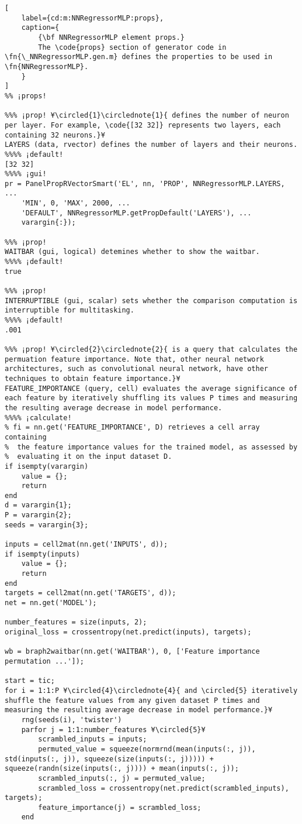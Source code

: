 \documentclass{tufte-handout}
\begin{document}
\begin{lstlisting}[
	label={cd:m:NNRegressorMLP:props},
	caption={
		{\bf NNRegressorMLP element props.}
		The \code{props} section of generator code in \fn{\_NNRegressorMLP.gen.m} defines the properties to be used in \fn{NNRegressorMLP}.
	}
]
%% ¡props!

%%% ¡prop! ¥\circled{1}\circlednote{1}{ defines the number of neuron per layer. For example, \code{[32 32]} represents two layers, each containing 32 neurons.}¥
LAYERS (data, rvector) defines the number of layers and their neurons.
%%%% ¡default!
[32 32]
%%%% ¡gui!
pr = PanelPropRVectorSmart('EL', nn, 'PROP', NNRegressorMLP.LAYERS, ...
    'MIN', 0, 'MAX', 2000, ...
    'DEFAULT', NNRegressorMLP.getPropDefault('LAYERS'), ...
    varargin{:});

%%% ¡prop!
WAITBAR (gui, logical) detemines whether to show the waitbar.
%%%% ¡default!
true

%%% ¡prop!
INTERRUPTIBLE (gui, scalar) sets whether the comparison computation is interruptible for multitasking.
%%%% ¡default!
.001

%%% ¡prop! ¥\circled{2}\circlednote{2}{ is a query that calculates the permuation feature importance. Note that, other neural network architectures, such as convolutional neural network, have other techniques to obtain feature importance.}¥
FEATURE_IMPORTANCE (query, cell) evaluates the average significance of each feature by iteratively shuffling its values P times and measuring the resulting average decrease in model performance.
%%%% ¡calculate!
% fi = nn.get('FEATURE_IMPORTANCE', D) retrieves a cell array containing
%  the feature importance values for the trained model, as assessed by
%  evaluating it on the input dataset D.
if isempty(varargin)
    value = {};
    return
end
d = varargin{1};
P = varargin{2};
seeds = varargin{3};

inputs = cell2mat(nn.get('INPUTS', d));
if isempty(inputs)
    value = {};
    return
end
targets = cell2mat(nn.get('TARGETS', d));
net = nn.get('MODEL');

number_features = size(inputs, 2);
original_loss = crossentropy(net.predict(inputs), targets);

wb = braph2waitbar(nn.get('WAITBAR'), 0, ['Feature importance permutation ...']);

start = tic;
for i = 1:1:P ¥\circled{4}\circlednote{4}{ and \circled{5} iteratively shuffle the feature values from any given dataset P times and measuring the resulting average decrease in model performance.}¥
    rng(seeds(i), 'twister')
    parfor j = 1:1:number_features ¥\circled{5}¥
        scrambled_inputs = inputs;
        permuted_value = squeeze(normrnd(mean(inputs(:, j)), std(inputs(:, j)), squeeze(size(inputs(:, j))))) + squeeze(randn(size(inputs(:, j)))) + mean(inputs(:, j));
        scrambled_inputs(:, j) = permuted_value;
        scrambled_loss = crossentropy(net.predict(scrambled_inputs), targets);
        feature_importance(j) = scrambled_loss;
    end


\end{lstlisting}
\end{document}
